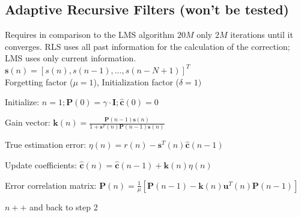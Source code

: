 \subsection{Adaptive Recursive Filters (won't be tested) }
\begin{minipage}{8.4cm}
    Requires in comparison to the LMS algorithm $20M$ only $2M$ iterations until it converges. RLS uses all past 
    information for the calculation of the correction; LMS uses only current information. \\
    $\mathbf{s}(n) = [s(n), s(n-1), \ldots, s(n - N + 1)]^T$ \\
    Forgetting factor ($\mu=1$),
    Initialization factor ($\delta = 1)$
\end{minipage}
\begin{minipage}{11cm}
    \begin{aufzaehlung}
        \item Initialize: $n=1; \mathbf{P}(0)=\gamma \cdot \mathbf{I}; \mathbf{\hat{c}}(0)=0$
        \item Gain vector: $ \mathbf{k}(n) = \frac{\mathbf{P}(n-1)\mathbf{s}(n)}{1 + \mathbf{s}^T(n) \mathbf{P}(n-1) \mathbf{s}(n)}$
        \item True estimation error: $\eta(n) = r(n) - \mathbf{s}^T(n) \mathbf{\hat{c}}(n-1)$
        \item Update coefficients: $\mathbf{\hat{c}}(n) = \mathbf{\hat{c}}(n-1) + \mathbf{k}(n) \eta(n)$
        \item Error correlation matrix: \small $\mathbf P(n) = \frac1\mu [ \mathbf P (n-1) - \mathbf k (n) \mathbf u^T (n) \mathbf P(n-1)]$
\normalsize        \item $n++$ and back to step 2
    \end{aufzaehlung}
\end{minipage}
